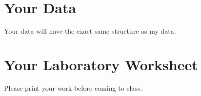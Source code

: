 \section{Your Data}
%
Your data will have the exact same structure as my data.
%
%
\newpage
\section{Your Laboratory Worksheet}
%
Please print your work before coming to class.
%

